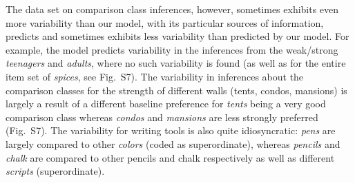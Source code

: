 \documentclass[doc, floatsintext]{apa6}
\newcommand{\ndg}[1]{\textcolor{Green}{[ndg: #1]}}
\begin{document}
The data set on comparison class inferences, however, sometimes exhibits even more variability than our model, with its particular sources of information, predicts and sometimes exhibits less variability than predicted by our model. 
For example, the model predicts variability in the inferences from the weak/strong \emph{teenagers} and \emph{adults}, where no such variability is found (as well as for the entire item set of \emph{spices}, see Fig.~S7). 
The variability in inferences about the comparison classes for the strength of different walls (tents, condos, mansions) is largely a result of a different baseline preference for \emph{tents} being a very good comparison class whereas \emph{condos} and \emph{mansions} are less strongly preferred (Fig.~S7).
The variability for writing tools is also quite idiosyncratic: \emph{pens} are largely compared to other \emph{colors} (coded as superordinate), whereas \emph{pencils} and \emph{chalk} are compared to other pencils and chalk respectively as well as different \emph{scripts} (superordinate). 




\end{document}
